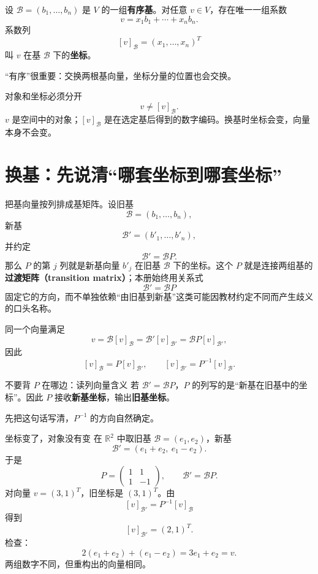 \documentclass[11pt,a4paper]{ctexart}
\newcommand{\kw}[1]{\textbf{\color{deep}#1}}
\begin{document}
设 $\mathcal B=(b_1,\dots,b_n)$ 是 $V$ 的一组\kw{有序基}。对任意 $v\in V$，存在唯一一组系数
\[
v=x_1b_1+\cdots+x_nb_n.
\]
系数列
\[
[v]_{\mathcal B}=(x_1,\dots,x_n)^T
\]
叫 $v$ 在基 $\mathcal B$ 下的\kw{坐标}。

“有序”很重要：交换两根基向量，坐标分量的位置也会交换。

\begin{corebox}{对象和坐标必须分开}
\[
\boxed{v\neq[v]_{\mathcal B}.}
\]
$v$ 是空间中的对象；$[v]_{\mathcal B}$ 是在选定基后得到的数字编码。换基时坐标会变，向量本身不会变。
\end{corebox}

\section{换基：先说清“哪套坐标到哪套坐标”}

把基向量按列排成基矩阵。设旧基
\[
\mathcal B=(b_1,\dots,b_n),
\]
新基
\[
\mathcal B'=(b'_1,\dots,b'_n),
\]
并约定
\[
\mathcal B'=\mathcal BP.
\]
那么 $P$ 的第 $j$ 列就是新基向量 $b'_j$ 在旧基 $\mathcal B$ 下的坐标。这个 $P$ 就是连接两组基的\kw{过渡矩阵（transition matrix）}；本册始终用关系式
\[
\mathcal B'=\mathcal BP
\]
固定它的方向，而不单独依赖“由旧基到新基”这类可能因教材约定不同而产生歧义的口头名称。

同一个向量满足
\[
v=\mathcal B[v]_{\mathcal B}
=\mathcal B'[v]_{\mathcal B'}
=\mathcal BP[v]_{\mathcal B'},
\]
因此
\[
\boxed{[v]_{\mathcal B}=P[v]_{\mathcal B'},
\qquad
[v]_{\mathcal B'}=P^{-1}[v]_{\mathcal B}.}
\]

\begin{methodbox}{不要背 $P$ 在哪边：读列向量含义}
若 $\mathcal B'=\mathcal BP$，$P$ 的列写的是“新基在旧基中的坐标”。因此 $P$ 接收\kw{新基坐标}，输出\kw{旧基坐标}。

先把这句话写清，$P^{-1}$ 的方向自然确定。
\end{methodbox}

\begin{examplebox}{坐标变了，对象没有变}
在 $\mathbb R^2$ 中取旧基 $\mathcal B=(e_1,e_2)$，新基
\[
\mathcal B'=(e_1+e_2,\ e_1-e_2).
\]
于是
\[
P=\begin{pmatrix}1&1\\1&-1\end{pmatrix},
\qquad \mathcal B'=\mathcal BP.
\]
对向量 $v=(3,1)^T$，旧坐标是 $(3,1)^T$。由
\[
[v]_{\mathcal B'}=P^{-1}[v]_{\mathcal B}
\]
得到
\[
[v]_{\mathcal B'}=(2,1)^T.
\]
检查：
\[
2(e_1+e_2)+(e_1-e_2)=3e_1+e_2=v.
\]
两组数字不同，但重构出的向量相同。
\end{examplebox}
\end{document}
